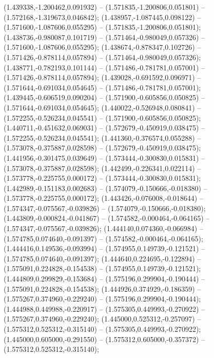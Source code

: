  (1.439338,-1.200462,0.091932) -- (1.571835,-1.200806,0.051801) -- (1.572168,-1.319673,0.046842);
 (1.438957,-1.087445,0.098122) -- (1.571600,-1.087606,0.055295) -- (1.571835,-1.200806,0.051801);
 (1.438736,-0.980087,0.101719) -- (1.571464,-0.980049,0.057326) -- (1.571600,-1.087606,0.055295);
 (1.438674,-0.878347,0.102726) -- (1.571426,-0.878114,0.057894) -- (1.571464,-0.980049,0.057326);
 (1.438771,-0.782193,0.101144) -- (1.571486,-0.781781,0.057001) -- (1.571426,-0.878114,0.057894);
 (1.439028,-0.691592,0.096971) -- (1.571644,-0.691034,0.054645) -- (1.571486,-0.781781,0.057001);
 (1.439445,-0.606519,0.090204) -- (1.571900,-0.605856,0.050825) -- (1.571644,-0.691034,0.054645);
 (1.440022,-0.526948,0.080841) -- (1.572255,-0.526234,0.045541) -- (1.571900,-0.605856,0.050825);
 (1.440711,-0.451632,0.069031) -- (1.572679,-0.450919,0.038475) -- (1.572255,-0.526234,0.045541);
 (1.441360,-0.376574,0.055288) -- (1.573078,-0.375887,0.028598) -- (1.572679,-0.450919,0.038475);
 (1.441956,-0.301475,0.039649) -- (1.573444,-0.300830,0.015831) -- (1.573078,-0.375887,0.028598);
 (1.442499,-0.226341,0.022114) -- (1.573778,-0.225755,0.000172) -- (1.573444,-0.300830,0.015831);
 (1.442989,-0.151183,0.002683) -- (1.574079,-0.150666,-0.018380) -- (1.573778,-0.225755,0.000172);
 (1.443426,-0.076008,-0.018644) -- (1.574347,-0.075567,-0.039826) -- (1.574079,-0.150666,-0.018380);
 (1.443809,-0.000824,-0.041867) -- (1.574582,-0.000464,-0.064165) -- (1.574347,-0.075567,-0.039826);
 (1.444140,0.074360,-0.066984) -- (1.574785,0.074640,-0.091397) -- (1.574582,-0.000464,-0.064165);
 (1.444416,0.149536,-0.093994) -- (1.574955,0.149739,-0.121521) -- (1.574785,0.074640,-0.091397);
 (1.444640,0.224695,-0.122894) -- (1.575091,0.224828,-0.154538) -- (1.574955,0.149739,-0.121521);
 (1.444809,0.299829,-0.153684) -- (1.575196,0.299904,-0.190444) -- (1.575091,0.224828,-0.154538);
 (1.444926,0.374929,-0.186359) -- (1.575267,0.374960,-0.229240) -- (1.575196,0.299904,-0.190444);
 (1.444988,0.449988,-0.220917) -- (1.575305,0.449993,-0.270922) -- (1.575267,0.374960,-0.229240);
 (1.445000,0.525312,-0.257097) -- (1.575312,0.525312,-0.315140) -- (1.575305,0.449993,-0.270922);
 (1.445000,0.605000,-0.291550) -- (1.575312,0.605000,-0.357372) -- (1.575312,0.525312,-0.315140);
